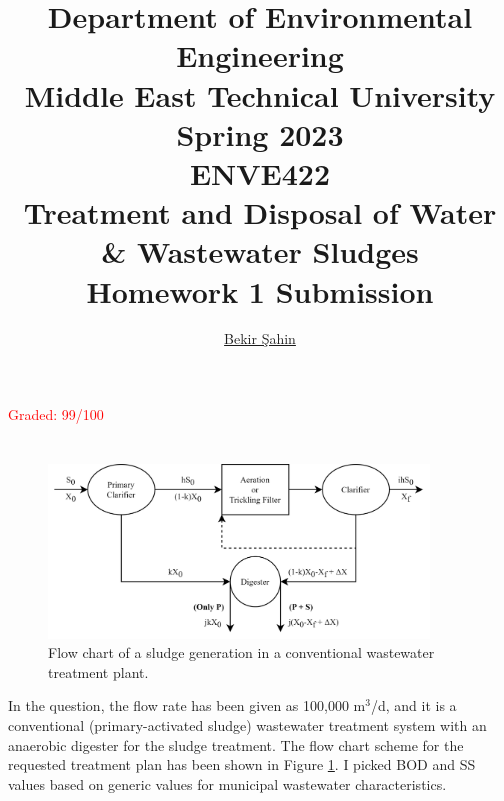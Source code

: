 \documentclass[a4paper]{article}
\title{Department of Environmental Engineering\\Middle East Technical University\\Spring 2023\\ENVE422\\Treatment and Disposal of Water \& Wastewater Sludges\\Homework 1 Submission} %
\author{\href{sahin.bekir@metu.edu.tr}{Bekir Şahin}} %
\begin{document}
\setcounter{page}{0}
\onehalfspacing
\maketitle %
\thispagestyle{empty}
\begin{center}
    \huge \textcolor{red}{Graded: 99/100}
\end{center}
\newpage
\section{} %
\begin{figure}[h]
    \centering
    \includegraphics[width=0.9\textwidth]{SludgeQuantities.png}
    \caption{Flow chart of a sludge generation in a conventional wastewater treatment plant.}
    \label{fig:SludgeQuantities}
\end{figure}
\begin{minipage}[c]{0.5\textwidth}
In the question, the flow rate has been given as 100,000 m$^3$/d, and it is a conventional (primary-activated sludge) wastewater treatment system with an anaerobic digester for the sludge treatment. The flow chart scheme for the requested treatment plan has been shown in Figure \ref{fig:SludgeQuantities}. I picked BOD and SS values based on generic values for municipal wastewater characteristics\autocite{sanin2011,vesilind1988,metcalf2014}.
\end{minipage}
\hfill
\begin{minipage}{0.4\textwidth}
\end{minipage}
\end{document}
